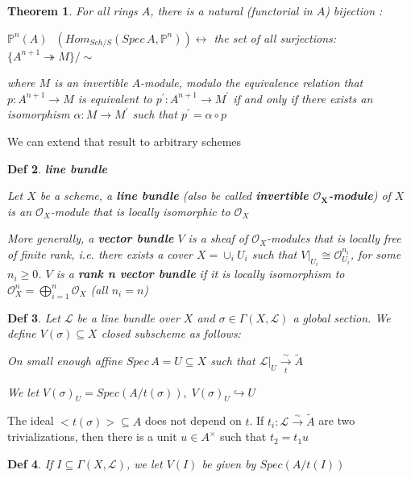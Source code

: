\documentclass{article}
\newtheorem{theorem}{Theorem}[section]
\newtheorem{definition}[theorem]{Def}
\begin{document}
\begin{theorem}
    For all rings $A$, there is a natural (functorial in $A$) bijection :
    
$\mathbb P^n(A)\;$
$(Hom_{Sch/S}(Spec\, A,\mathbb P^n)) \leftrightarrow$ the set
of all surjections: $\{A^{n+1} \twoheadrightarrow M\}/\sim$ 

where $M$ is an invertible $A$-module, modulo the equivalence relation that
$p : A^{n+1} \to M$ is equivalent to $p^\prime : A^{n+1} \to M^\prime$ if and only if there exists an isomorphism $\alpha : M \to M
^\prime$
such that $p
^\prime = \alpha\circ p$
\end{theorem}

We can extend that result to arbitrary schemes

\begin{definition}
    \textbf{line bundle}

    Let $X$ be a scheme, a \textbf{line bundle} (also be called \textbf{ invertible $\bm{\mathcal O_X}$-module}) of $X$ is an $\mathcal O_X$-module that is locally isomorphic to $\mathcal O_X$

    More generally, a \textbf{vector bundle} $V$ is a sheaf of $\mathcal O_X$-modules that is locally free of finite rank, i.e. there exists a cover $X =\cup_i U_i$ such that $V|_{U_i}\cong \mathcal O^{n_i}_{U_i}$, for some $n_i \geq 0$. $V$ is a \textbf{rank n vector bundle} if it is locally isomorphism to $\mathcal O_X^n=\bigoplus^n_{i=1}\mathcal O_X$ (all $n_i=n$)
\end{definition}

\begin{definition}
    Let $\mathcal L$ be a line bundle over $X$ and $\sigma\in\Gamma(X,\mathcal L)$ a global section. We define $V(\sigma)\subseteq X$ closed subscheme as follows:

    On small enough affine $Spec\,A=U\subseteq X$ such that $\mathcal L|_U\xrightarrow[t]{\sim}\widetilde A$
    
    We let $V(\sigma)_U=Spec(A/t(\sigma)),\;V(\sigma)_U\hookrightarrow U$
\end{definition}

The ideal $<t(\sigma)>\subseteq A$ does not depend on $t$. If $t_i:\mathcal L\xrightarrow{\sim}\widetilde A$ are two trivializations, then there is a unit $u\in A^{\times}$ such that $t_2=t_1u$

\begin{definition}
    If $I\subseteq\Gamma(X,\mathcal L)$, we let $V(I)$ be given by $Spec(A/t(I))$
\end{definition}
\end{document}
